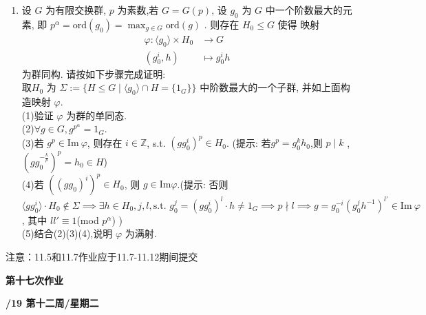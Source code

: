 \documentclass[a4paper,12pt]{article}
\begin{document}
\begin{enumerate}
    \item 设 $G$ 为有限交换群, $p$ 为素数,若 $G=G(p)$, 设 $g_0$ 为 $G$ 中一个阶数最大的元素, 即 $p^\alpha=\text{ord}(g_0)=\max_{g\in G} \text{ord}(g)$ . 则存在 $H_0\leq G$ 使得 映射 
    \begin{align*}
    \varphi: \langle g_0\rangle \times H_0&\longrightarrow G\\
    (g_0^i,h)&\longmapsto g_0^ih
    \end{align*}
    为群同构. 请按如下步骤完成证明:\\
    取$H_0$ 为 $\Sigma:=\{H\leq G\mid \langle g_0\rangle \cap H=\{1_G\}\}$ 中阶数最大的一个子群, 并如上面构造映射 $\varphi$.  \\
    (1)\quad 验证 $\varphi$ 为群的单同态.\\
    (2)\quad $\forall g\in G,g^{p^\alpha}=1_G$.\\
    (3)\quad 若 $g^p\in \text{Im}\ \varphi$, 则存在 $i\in\mathbb{Z}$, s.t. $(gg_0^i)^p\in H_0$. (提示: 若$g^p=g_0^kh_0$,则 $p\mid k$ ,$(gg_0^{-\frac{k}{p}})^p=h_0\in H$)\\
    (4)\quad 若 $((gg_0)^i)^p \in H_0$, 则 $g\in \text{Im}\varphi$.(提示: 否则 $\langle gg_0^i\rangle \cdot H_0\notin \Sigma\implies \exists h\in H_0,j,l,\text{s.t. } g_0^j=(gg_0^i)^l\cdot h\not=1_G\implies p\nmid l\implies g=g_0^{-i} (g_0^j h^{-1})^{l'}\in \text{Im}\ \varphi$, 其中 $ll'\equiv 1$(mod $p^\alpha$) )\\
    (5)\quad 结合(2)(3)(4),说明 $\varphi$ 为满射. 
\end{enumerate}

{\color{red} 注意：11.5和11.7作业应于11.7-11.12期间提交}


\newpage
\head

\begin{center} %
	{\Large \bf 第十七次作业} %
	\vspace{2mm}
	
	{\bf{}/19 \quad  第十二周/星期二} %
\end{center} 
\end{document}
